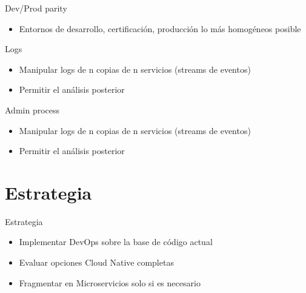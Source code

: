 \documentclass[aspectratio=169]{beamer}
\begin{document}
\begin{frame}{Dev/Prod parity}
\begin{itemize}
	\item Entornos de desarrollo, certificación, producción lo más homogéneos posible
\end{itemize}
\end{frame}

\begin{frame}{Logs}
\begin{itemize}
	\item Manipular logs de n copias de n servicios (streams de eventos)
	\item Permitir el análisis posterior
\end{itemize}
\end{frame}

\begin{frame}{Admin process}
\begin{itemize}
	\item Manipular logs de n copias de n servicios (streams de eventos)
	\item Permitir el análisis posterior
\end{itemize}
\end{frame}
{
    \section{Estrategia}
}

\begin{frame}{Estrategia}
\begin{itemize}
	\item Implementar DevOps sobre la base de código actual
    \item Evaluar opciones Cloud Native completas
    \item Fragmentar en Microservicios solo si es necesario
\end{itemize}
\end{frame}
\end{document}
